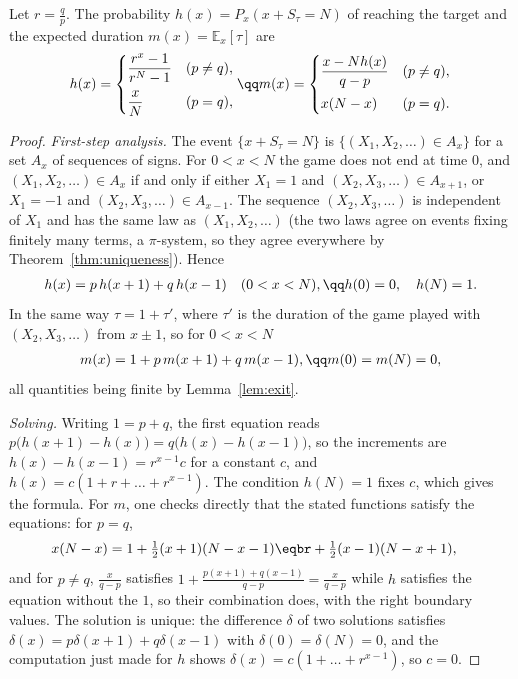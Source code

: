 \begin{theorem}\label{thm:ruin}
Let $r=\frac qp$. The probability $h(x)=P_x(x+S_\tau=N)$ of reaching the target and the expected duration $m(x)=\mathbb E_x[\tau]$ are
\[
\begin{gathered}h(x)=\begin{cases}\dfrac{r^x-1}{r^N-1}&(p\ne q),\\[2ex]\dfrac xN&(p=q),\end{cases}\qq m(x)=\begin{cases}\dfrac{x-Nh(x)}{q-p}&(p\ne q),\\[2ex]x(N-x)&(p=q).\end{cases}\end{gathered}
\]
\end{theorem}
\begin{proof}
\emph{First-step analysis.} The event $\{x+S_\tau=N\}$ is $\{(X_1,X_2,\ldots)\in A_x\}$ for a set $A_x$ of sequences of signs. For $0<x<N$ the game
does not end at time $0$, and $(X_1,X_2,\ldots)\in A_x$ if and only if either $X_1=1$ and $(X_2,X_3,\ldots)\in A_{x+1}$, or $X_1=-1$ and
$(X_2,X_3,\ldots)\in A_{x-1}$. The sequence $(X_2,X_3,\ldots)$ is independent of $X_1$ and has the same law as $(X_1,X_2,\ldots)$ (the two laws agree
on events fixing finitely many terms, a $\pi$-system, so they agree everywhere by Theorem~\ref{thm:uniqueness}). Hence
\[
\begin{gathered}h(x)=p\,h(x+1)+q\,h(x-1)\quad(0<x<N),\qq h(0)=0,\quad h(N)=1.\end{gathered}
\]
In the same way $\tau=1+\tau'$, where $\tau'$ is the duration of the game played with $(X_2,X_3,\ldots)$ from $x\pm1$, so for $0<x<N$
\[
\begin{gathered}m(x)=1+p\,m(x+1)+q\,m(x-1),\qq m(0)=m(N)=0,\end{gathered}
\]
all quantities being finite by Lemma~\ref{lem:exit}.

\emph{Solving.} Writing $1=p+q$, the first equation reads $p\bigl(h(x+1)-h(x)\bigr)=q\bigl(h(x)-h(x-1)\bigr)$, so the increments are
$h(x)-h(x-1)=r^{x-1}c$ for a constant $c$, and $h(x)=c(1+r+\dots+r^{x-1})$. The condition $h(N)=1$ fixes $c$, which gives the formula. For
$m$, one checks directly that the stated functions satisfy the equations: for $p=q$,
\[
\begin{aligned}x(N-x)&=1+\tfrac12(x+1)(N-x-1)\eqbr+\tfrac12(x-1)(N-x+1),\end{aligned}
\]
and for $p\ne q$, $\frac x{q-p}$ satisfies $1+\frac{p(x+1)+q(x-1)}{q-p}=\frac x{q-p}$ while $h$ satisfies the equation without the $1$, so their
combination does, with the right boundary values. The solution is unique: the difference $\delta$ of two solutions
satisfies $\delta(x)=p\delta(x+1)+q\delta(x-1)$ with $\delta(0)=\delta(N)=0$, and the computation just made for $h$ shows $\delta(x)=c(1+\dots+r^{x-1})$, so $c=0$.
\end{proof}

